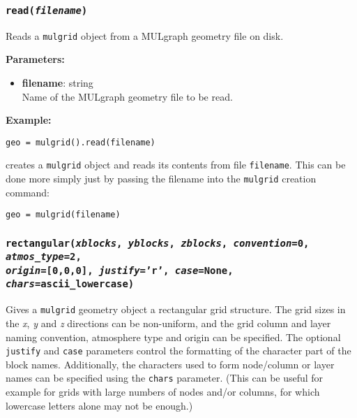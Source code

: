 \begin{snugshade}\subsubsection{\texttt{read(\emph{filename})}}\end{snugshade}
\label{sec:mulgrid:read}

Reads a \texttt{mulgrid} object from a MULgraph geometry file on disk.

\textbf{Parameters:}
\begin{itemize}
\item \textbf{filename}: string\\
  Name of the MULgraph geometry file to be read.
\end{itemize}

\textbf{Example:}

\begin{lstlisting}
geo = mulgrid().read(filename)
\end{lstlisting}

creates a \texttt{mulgrid} object and reads its contents from file \texttt{filename}.  This can be done more simply just by passing the filename into the \texttt{mulgrid} creation command:

\begin{lstlisting}
geo = mulgrid(filename)
\end{lstlisting}

\begin{snugshade}
\subsubsection{\texttt{rectangular(\emph{xblocks}, \emph{yblocks}, \emph{zblocks}, \emph{convention}=0, \emph{atmos\_type}=2,\\
    \emph{origin}=[0,0,0], \emph{justify}='r', \emph{case}=None, \emph{chars}=ascii\_lowercase)}}\end{snugshade}
\label{sec:mulgrid:rectangular}

Gives a \texttt{mulgrid} geometry object a rectangular grid structure.  The grid sizes in the \emph{x}, \emph{y} and \emph{z} directions can be non-uniform, and the grid column and layer naming convention, atmosphere type and origin can be specified.  The optional \texttt{justify} and \texttt{case} parameters control the formatting of the character part of the block names.  Additionally, the characters used to form node/column or layer names can be specified using the \texttt{chars} parameter.  (This can be useful for example for grids with large numbers of nodes and/or columns, for which lowercase letters alone may not be enough.)

